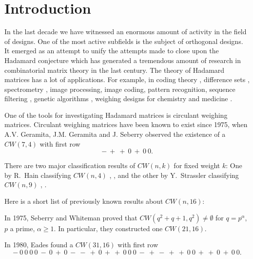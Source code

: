 \normalsize{
\section{Introduction}\label{sec0}
In the last
decade we have witnessed an enormous amount of activity in the field of designs. One of the most active subfields is the subject of orthogonal designs. 
It emerged as an attempt to unify the attempts made to close upon the Hadamard 
conjecture which has generated a 
tremendous amount of research in combinatorial matrix theory in the last 
century. 
The theory of Hadamard matrices has a lot of applications. For example, in coding theory \cite{sy92}, difference sets \cite{jun92}, spectrometry \cite{hs79}, image processing, image coding, 
	   pattern recognition, sequence filtering \cite{hal79}, genetic algorithms \cite{koe94}, 
	   weighing designs for chemistry and medicine \cite{kal75}. 

One of the tools for investigating Hadamard matrices is circulant weighing
matrices.  
%
%
Circulant weighing matrices have been known to exist since 1975, when 
A.V. Geramita, J.M. Geramita and J. Seberry \cite{ggs76} observed the existence of a $CW(7,4)$ with first 
row 
	$$ - \ + \ + \ 0 \ + \ 0 \ 0. $$


There are two major classification results of $CW(n,k)$ for fixed weight $k$: 
One by R.~Hain classifying $CW(n,4) $ \cite{hai77}, \cite{eh76}, and the other by 
Y.~Strassler classifying $CW(n,9)$ \cite{str83}, \cite{str}. 

Here is a short list of previously known results about $CW(n,16)$:  

In 1975, Seberry and Whiteman \cite{sw75} proved that 
$CW(q^2+q+1,q^2) \neq \emptyset$ for $q=p^{\alpha}$, $p$ a prime, $\alpha \geq 1$. 
In particular, they constructed one $CW(21,16)$.

In 1980, Eades \cite{ead80} found a $CW(31,16)$ with first row
	$$- \ 0 \ 0 \ 0 \ 0 \ - \ 0 \ + \ 0 \ - \ - \ + \ 0 \ + \ + \ 0 \ 0 \ 0 \ - \ + \ - \ + \ + \ 0 \ 0 \ + \ + \ 0 \ + \ 0 \ 0.$$

}
